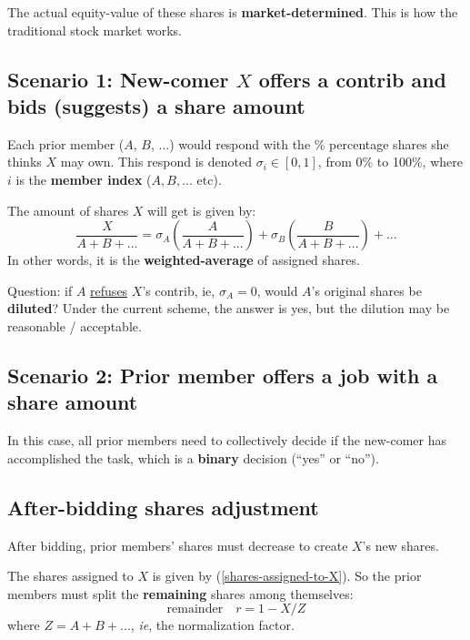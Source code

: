 \documentclass[12pt, orivec, fleqn]{article}
\begin{document}
The actual equity-value of these shares is \textbf{market-determined}.  This is how the traditional stock market works.

\secttoc
\subsection{Scenario 1:  New-comer $X$ offers a contrib and bids (suggests) a share amount}

Each prior member ($A$, $B$, ...) would respond with the \% percentage shares she thinks $X$ may own.  This respond is denoted $\sigma_i \in [0,1]$, from 0\% to 100\%, where $i$ is the \textbf{member index} ($A, B, ... $ etc).

The amount of shares $X$ will get is given by:
\begin{equation}
\label{shares-assigned-to-X}
\frac{X}{A + B + ...} = \sigma_A (\frac{A}{A + B + ...}) + \sigma_B (\frac{B}{A + B + ...}) + ...
\end{equation}
In other words, it is the \textbf{weighted-average} of assigned shares.

Question:  if $A$ \uline{refuses} $X$'s contrib, ie, $\sigma_A = 0$, would $A$'s original shares be \textbf{diluted}?  Under the current scheme, the answer is yes, but the dilution may be reasonable / acceptable.

\secttoc
\subsection{Scenario 2:  Prior member offers a job with a share amount}

In this case, all prior members need to collectively decide if the new-comer has accomplished the task, which is a \textbf{binary} decision (``yes'' or ``no'').

\secttoc
\subsection{After-bidding shares adjustment}

After bidding, prior members' shares must decrease to create $X$'s new shares.

The shares assigned to $X$ is given by (\ref{shares-assigned-to-X}).  So the prior members must split the \textbf{remaining} shares among themselves:
\begin{equation}
\boxed{\mbox{remainder}} \quad r = 1 - X / Z
\end{equation}
where $Z = A + B + ...$, \textit{ie}, the normalization factor.
\end{document}
